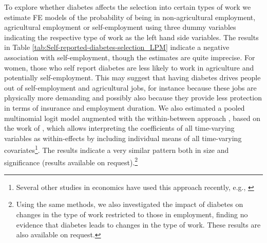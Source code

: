 \documentclass[12pt,english]{article}
\begin{document}
To explore whether diabetes affects the selection into certain types of work we estimate \ac{FE} models of the probability of being in non-agricultural employment, agricultural employment or self-employment using three dummy variables indicating the respective type of work as the left hand side variables. The results in Table \ref{tab:Self-reported-diabetes-selection_LPM} indicate a negative association with self-employment, though the estimates are quite imprecise. For women, those who self report diabetes are less likely to work in agriculture and potentially self-employment. This may suggest that having diabetes drives people out of self-employment and agricultural jobs, for instance because these jobs are physically more demanding and possibly also because they provide less protection in terms of insurance and employment duration. We also estimated a pooled multinomial logit model augmented  with the within-between approach \parencite{Bell2015}, based on the work of \textcite{Mundlak1978}, which allows interpreting the coefficients of all time-varying variables as within-effects by including individual means of all time-varying covariates\footnote{Several other studies in economics have used this approach recently, e.g., \textcite{Geishecker2011,Wunder2014,Boll2016}}. The results indicate a very similar pattern both in size and significance (results available on request).\footnote{Using the same methods, we also investigated the impact of diabetes on changes in the type of work restricted to those in employment, finding no evidence that diabetes leads to changes in the type of work. These results are also available on request.}

\end{document}
